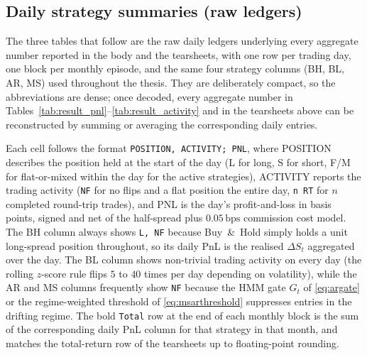 \subsection{Daily strategy summaries (raw ledgers)}\label{sec:apx-daily-tables}

The three tables that follow are the raw daily ledgers underlying every aggregate number reported in the body and the tearsheets, with one row per trading day, one block per monthly episode, and the same four strategy columns (BH, BL, AR, MS) used throughout the thesis. They are deliberately compact, so the abbreviations are dense; once decoded, every aggregate number in Tables~\ref{tab:result_pnl}--\ref{tab:result_activity} and in the tearsheets above can be reconstructed by summing or averaging the corresponding daily entries.

Each cell follows the format \texttt{POSITION, ACTIVITY; PNL}, where POSITION describes the position held at the start of the day (L for long, S for short, F/M for flat-or-mixed within the day for the active strategies), ACTIVITY reports the trading activity (\texttt{NF} for no flips and a flat position the entire day, \texttt{n\,RT} for $n$ completed round-trip trades), and PNL is the day's profit-and-loss in basis points, signed and net of the half-spread plus $0.05\,\text{bps}$ commission cost model. The BH column always shows \texttt{L, NF} because Buy~\&~Hold simply holds a unit long-spread position throughout, so its daily PnL is the realised $\Delta S_t$ aggregated over the day. The BL column shows non-trivial trading activity on every day (the rolling $z$-score rule flips $5$ to $40$ times per day depending on volatility), while the AR and MS columns frequently show \texttt{NF} because the HMM gate $G_t$ of \eqref{eq:argate} or the regime-weighted threshold of \eqref{eq:msarthreshold} suppresses entries in the drifting regime. The bold \texttt{Total} row at the end of each monthly block is the sum of the corresponding daily PnL column for that strategy in that month, and matches the total-return row of the tearsheets up to floating-point rounding.

